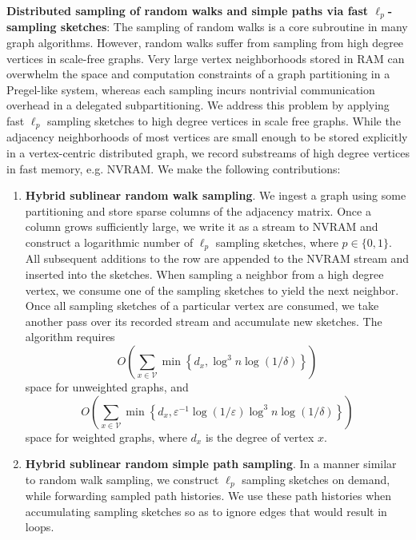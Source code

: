 \documentclass{report}
\begin{document}
\noindent
\textbf{Distributed sampling of random walks and simple paths via fast $\ell_p$-sampling sketches}:
The sampling of random walks is a core subroutine in many graph algorithms.
However, random walks suffer from sampling from high degree vertices in scale-free graphs. 
Very large vertex neighborhoods stored in RAM can overwhelm the space and computation constraints of a graph partitioning in a Pregel-like system, whereas each sampling incurs nontrivial communication overhead in a delegated subpartitioning. 
We address this problem by applying fast $\ell_p$ sampling sketches to high degree vertices in scale free graphs. 
While the adjacency neighborhoods of most vertices are small enough to be stored explicitly in a vertex-centric distributed graph, we record substreams of high degree vertices in fast memory, e.g. NVRAM. 
We make the following contributions:
%
\begin{enumerate}
	\item \textbf{Hybrid sublinear random walk sampling}. 
	We ingest a graph using some partitioning and store sparse columns of the adjacency matrix. 
	Once a column grows sufficiently large, we write it as a stream to NVRAM and construct a logarithmic number of $\ell_p$ sampling sketches, where $p \in \{0,1\}$. 
	All subsequent additions to the row are appended to the NVRAM stream and inserted into the sketches. 
	When sampling a neighbor from a high degree vertex, we consume one of the sampling sketches to yield the next neighbor.
	Once all sampling sketches of a particular vertex are consumed, we take another pass over its recorded stream and accumulate new sketches.
	The algorithm requires
	\begin{equation*}
	O\left ( \sum_{x \in \mathcal{V}} \min \left \{ d_x, \log^3 n \log (1/\delta) \right \} \right )
	\end{equation*}
	space for unweighted graphs, and 
	\begin{equation*}
	O \left ( \sum_{x \in \mathcal{V}} \min \left \{ d_x, \varepsilon^{-1} \log (1 / \varepsilon) \log^3 n \log (1/\delta) \right \} \right )
	\end{equation*}
	space for weighted graphs, where $d_x$ is the degree of vertex $x$.
	\item \textbf{Hybrid sublinear random simple path sampling}.
	In a manner similar to random walk sampling, we construct $\ell_p$ sampling sketches on demand, while forwarding sampled path histories.
	We use these path histories when accumulating sampling sketches so as to ignore edges that would result in loops.
\end{enumerate}
%
\end{document}
